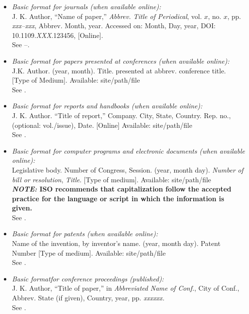 \documentclass{ieeeaccess}
\begin{document}
\begin{itemize}
\item \emph{Basic format for journals (when available online):}\\
J. K. Author, ``Name of paper,'' \emph{Abbrev. Title of Periodical}, vol. $x$, no. $x$, pp. \emph{xxx--xxx}, Abbrev. Month, year. Accessed on: Month, Day, year, DOI: 10.1109.\emph{XXX}.123456, [Online].\\
See \cite{b14}--\cite{b16}.

\item \emph{Basic format for papers presented at conferences (when available online): }\\
J.K. Author. (year, month). Title. presented at abbrev. conference title. [Type of Medium]. Available: site/path/file\\
See \cite{b17}.

\item \emph{Basic format for reports and handbooks (when available online):}\\
J. K. Author. ``Title of report,'' Company. City, State, Country. Rep. no., (optional: vol./issue), Date. [Online] Available: site/path/file\\
See \cite{b18,b19}.

\item \emph{Basic format for computer programs and electronic documents (when available online): }\\
Legislative body. Number of Congress, Session. (year, month day). \emph{Number of bill or resolution}, \emph{Title}. [Type of medium]. Available: site/path/file\\
\textbf{\emph{NOTE: }ISO recommends that capitalization follow the accepted practice for the language or script in which the information is given.}\\
See \cite{b20}.

\item \emph{Basic format for patents (when available online):}\\
Name of the invention, by inventor's name. (year, month day). Patent Number [Type of medium]. Available: site/path/file\\
See \cite{b21}.

\item \emph{Basic format}\emph{for conference proceedings (published):}\\
J. K. Author, ``Title of paper,'' in \emph{Abbreviated Name of Conf.}, City of Conf., Abbrev. State (if given), Country, year, pp. \emph{xxxxxx.}\\
See \cite{b22}.


\end{itemize}
\end{document}
